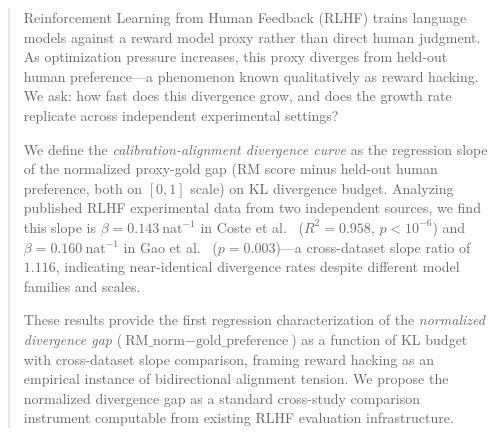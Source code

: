 \begin{abstract}
Reinforcement Learning from Human Feedback (RLHF) trains language models against a reward model proxy rather than direct human judgment. As optimization pressure increases, this proxy diverges from held-out human preference---a phenomenon known qualitatively as reward hacking. We ask: how fast does this divergence grow, and does the growth rate replicate across independent experimental settings?

We define the \emph{calibration-alignment divergence curve} as the regression slope of the normalized proxy-gold gap (RM score minus held-out human preference, both on $[0,1]$ scale) on KL divergence budget. Analyzing published RLHF experimental data from two independent sources, we find this slope is $\beta = 0.143\ \text{nat}^{-1}$ in Coste et al.~\cite{Coste2023Reward} ($R^2 = 0.958$, $p < 10^{-6}$) and $\beta = 0.160\ \text{nat}^{-1}$ in Gao et al.~\cite{Gao2023Scaling} ($p = 0.003$)---a cross-dataset slope ratio of $1.116$, indicating near-identical divergence rates despite different model families and scales.

These results provide the first regression characterization of the \emph{normalized divergence gap} ($\text{RM\_norm} - \text{gold\_preference}$) as a function of KL budget with cross-dataset slope comparison, framing reward hacking as an empirical instance of bidirectional alignment tension. We propose the normalized divergence gap as a standard cross-study comparison instrument computable from existing RLHF evaluation infrastructure.
\end{abstract}
